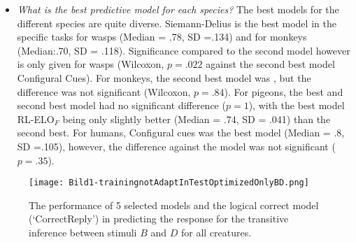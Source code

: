 \documentclass[10pt,letterpaper]{article}
\begin{document}
	\iffalse
	\begin{enumerate}
		
		
		\item Was ist eigentlich die Performanz der Spezies? Können Affen besser transitiv schließen als Menschen zb?
		
		monkeys: siemann delius (0.7027276 0.1183339) trabasso (0.7017958 0.1197)
		
		\item ist es sinnvoll, für alle spezies ein Modell zu suchen? y - wenn für alle tiere ein bestimmtes modell das beste ist, dann hat man das beantwortet
		
		\item gibt es ein Modell, das für alle Spezies am prädiktivsten ist? y
		
		\item wie gut können die modelle die unterschiede zwischen den spezies darstellen können (2-fache Homogenität) y
		
		\item was sind die fits innerhalb der tiere? Was sind die Parameter-Intervalle im fit? kann zb ein Lern-Parameter die Unterschiede darstellen? y
	\end{enumerate}
	\fi
	
	\begin{itemize}
		
		\item \emph{What is the best predictive model for each species?} The best models for the different species are quite diverse. Siemann-Delius is the best model in the specific tasks for wasps (Median = .78, SD =.134) and for monkeys (Median:.70, SD = .118). Significance compared to the second model however is only given for wasps (Wilcoxon, $p=.022$ against the second best model Configural Cues). For monkeys, the second best model was , but the difference was not significant (Wilcoxon, $p=.84$). For pigeons, the best and second best model had no significant difference ($p=1$), with the best model RL-ELO$_F$ being only slightly better (Median = .74, SD = .041) than the second best. For humans, Configural cues was the best model (Median = .8, SD =.105), however, the difference against the \citeauthor{trabasso1975} model was not significant ($p=.35$).
		
	\end{itemize}
	
	
	\begin{figure}
		\centering
		\texttt{[image: Bild1-trainingnotAdaptInTestOptimizedOnlyBD.png]}
		\caption{The performance of 5 selected models and the logical correct model (`CorrectReply') in predicting the response for the transitive inference between stimuli $B$ and $D$ for all creatures.}
		\label{fig:bild1-trainingoptimizedonlybd}
	\end{figure}
	
\end{document}
